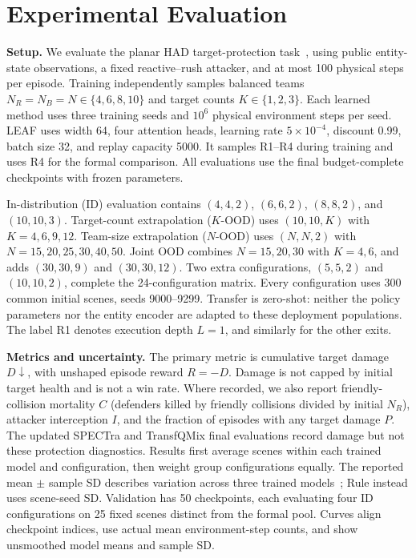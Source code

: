 \section{Experimental Evaluation}
\label{sec:results}


\noindent\textbf{Setup.}
We evaluate the planar HAD target-protection task~\cite{skyhad2026}, using public entity-state observations, a fixed reactive--rush attacker, and at most 100 physical steps per episode. Training independently samples balanced teams $N_R=N_B=N\in\{4,6,8,10\}$ and target counts $K\in\{1,2,3\}$. Each learned method uses three training seeds and $10^6$ physical environment steps per seed. LEAF uses width 64, four attention heads, learning rate $5\times10^{-4}$, discount 0.99, batch size 32, and replay capacity 5000. It samples R1--R4 during training and uses R4 for the formal comparison. All evaluations use the final budget-complete checkpoints with frozen parameters.

In-distribution (ID) evaluation contains $(4,4,2)$, $(6,6,2)$, $(8,8,2)$, and $(10,10,3)$. Target-count extrapolation ($K$-OOD) uses $(10,10,K)$ with $K=4,6,9,12$. Team-size extrapolation ($N$-OOD) uses $(N,N,2)$ with $N=15,20,25,30,40,50$. Joint OOD combines $N=15,20,30$ with $K=4,6$, and adds $(30,30,9)$ and $(30,30,12)$. Two extra configurations, $(5,5,2)$ and $(10,10,2)$, complete the 24-configuration matrix. Every configuration uses 300 common initial scenes, seeds 9000--9299. Transfer is zero-shot: neither the policy parameters nor the entity encoder are adapted to these deployment populations. The label R1 denotes execution depth $L=1$, and similarly for the other exits.

\noindent\textbf{Metrics and uncertainty.}
The primary metric is cumulative target damage $D\downarrow$, with unshaped episode reward $R=-D$. Damage is not capped by initial target health and is not a win rate. Where recorded, we also report friendly-collision mortality $C$ (defenders killed by friendly collisions divided by initial $N_R$), attacker interception $I$, and the fraction of episodes with any target damage $P$. The updated SPECTra and TransfQMix final evaluations record damage but not these protection diagnostics. Results first average scenes within each trained model and configuration, then weight group configurations equally. The reported mean $\pm$ sample SD describes variation across three trained models~\cite{agarwal2021rliable}; Rule instead uses scene-seed SD. Validation has 50 checkpoints, each evaluating four ID configurations on 25 fixed scenes distinct from the formal pool. Curves align checkpoint indices, use actual mean environment-step counts, and show unsmoothed model means and sample SD.

